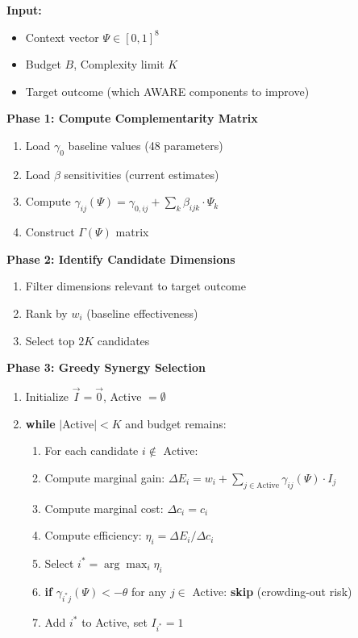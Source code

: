 \begin{tcolorbox}[colback=green!5!white, colframe=green!75!black,
    title=\textbf{Algorithm EIT-EMP-2-A1: EMERGE (Emergent Intervention Selection)}]

\textbf{Input:}
\begin{itemize}[nosep]
    \item Context vector $\Psi \in [0,1]^8$
    \item Budget $B$, Complexity limit $K$
    \item Target outcome (which AWARE components to improve)
\end{itemize}

\textbf{Phase 1: Compute Complementarity Matrix}
\begin{enumerate}[nosep]
    \item Load $\gamma_0$ baseline values (48 parameters)
    \item Load $\beta$ sensitivities (current estimates)
    \item Compute $\gamma_{ij}(\Psi) = \gamma_{0,ij} + \sum_k \beta_{ijk} \cdot \Psi_k$
    \item Construct $\Gamma(\Psi)$ matrix
\end{enumerate}

\textbf{Phase 2: Identify Candidate Dimensions}
\begin{enumerate}[nosep]
    \item Filter dimensions relevant to target outcome
    \item Rank by $w_i$ (baseline effectiveness)
    \item Select top $2K$ candidates
\end{enumerate}

\textbf{Phase 3: Greedy Synergy Selection}
\begin{enumerate}[nosep]
    \item Initialize $\vec{I} = \vec{0}$, Active $= \emptyset$
    \item \textbf{while} $|$Active$| < K$ and budget remains:
    \begin{enumerate}[nosep]
        \item For each candidate $i \notin$ Active:
        \item \quad Compute marginal gain: $\Delta E_i = w_i + \sum_{j \in \text{Active}} \gamma_{ij}(\Psi) \cdot I_j$
        \item \quad Compute marginal cost: $\Delta c_i = c_i$
        \item \quad Compute efficiency: $\eta_i = \Delta E_i / \Delta c_i$
        \item Select $i^* = \arg\max_i \eta_i$
        \item \textbf{if} $\gamma_{i^*j}(\Psi) < -\theta$ for any $j \in$ Active: \textbf{skip} (crowding-out risk)
        \item Add $i^*$ to Active, set $I_{i^*} = 1$
    \end{enumerate}
\end{enumerate}


\end{tcolorbox}
